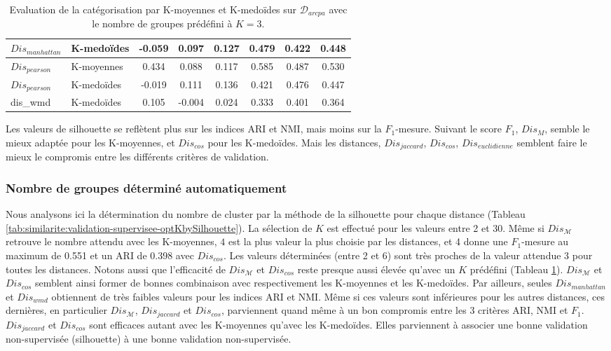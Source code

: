 \begin{table}[!htb]
\begin{tabular}[pos]{|l|l|c|c|c|c|c|c|}
		 $Dis_{manhattan}$  & K-medoïdes  & -0.059     & 0.097 & 0.127 & 0.479  & 0.422     & 0.448 \\ \hline
		 $Dis_{pearson}$    & K-moyennes    & 0.434      & 0.088 & 0.117 & 0.585  & 0.487     & 0.530 \\ \hline
		 $Dis_{pearson}$    & K-medoïdes  & -0.019     & 0.111 & 0.136 & 0.421  & 0.476     & 0.447 \\ \hline
		 dis\_wmd    & K-medoïdes  & 0.105 & -0.004&	0.024&	0.333&	0.401&	0.364 \\ \hline
	\end{tabular}
	\caption{Evaluation de la catégorisation par K-moyennes et K-medoïdes sur $\mathcal{D}_{arcpa}$ avec le nombre de groupes prédéfini à $K=3$.} \label{tab:similarite:validation-supervisee-k3}
\end{table}

Les valeurs de silhouette se reflètent plus sur les indices ARI et NMI, mais moins sur la $F_1$-mesure. Suivant le score $F_1$, $Dis_M$, semble le mieux adaptée pour les K-moyennes, et $Dis_{cos}$ pour les K-medoïdes. Mais les distances, $Dis_{jaccard}$, $Dis_{cos}$, $Dis_{euclidienne}$ semblent faire le mieux le compromis entre les différents critères de validation.


\subsubsection{Nombre de groupes déterminé automatiquement}
Nous analysons ici  la détermination du nombre de cluster par la méthode de la silhouette pour chaque distance (Tableau \ref{tab:similarite:validation-supervisee-optKbySilhouette}). La sélection de $K$ est effectué pour les valeurs entre 2 et 30. Même si $Dis_\mathcal{M}$ retrouve le nombre attendu avec les K-moyennes, $4$ est la plus valeur la plus choisie par les distances, et 4 donne une $F_1$-mesure au maximum de 0.551 et un ARI de 0.398 avec $Dis_{cos}$. Les valeurs déterminées (entre 2 et 6) sont très proches de la valeur attendue 3 pour toutes les distances.  Notons aussi que l'efficacité de $Dis_\mathcal{M}$ et $Dis_{cos}$ reste presque aussi élevée qu'avec un $K$ prédéfini (Tableau \ref{tab:similarite:validation-supervisee-k3}). $Dis_\mathcal{M}$ et $Dis_{cos}$ semblent ainsi former de bonnes combinaison avec respectivement les K-moyennes et les K-medoïdes. Par ailleurs, seules $Dis_{manhattan}$ et $Dis_{wmd}$ obtiennent de très faibles valeurs pour les indices ARI et NMI. Même si ces valeurs sont inférieures pour les autres distances, ces dernières, en particulier $Dis_\mathcal{M}$, $Dis_{jaccard}$ et $Dis_{cos}$, parviennent quand même à un bon compromis entre les 3 critères ARI, NMI et $F_1$. $Dis_{jaccard}$ et $Dis_{cos}$ sont efficaces autant avec les K-moyennes qu'avec les K-medoïdes. Elles parviennent à associer une bonne validation non-supervisée (silhouette) à une bonne validation non-supervisée.

